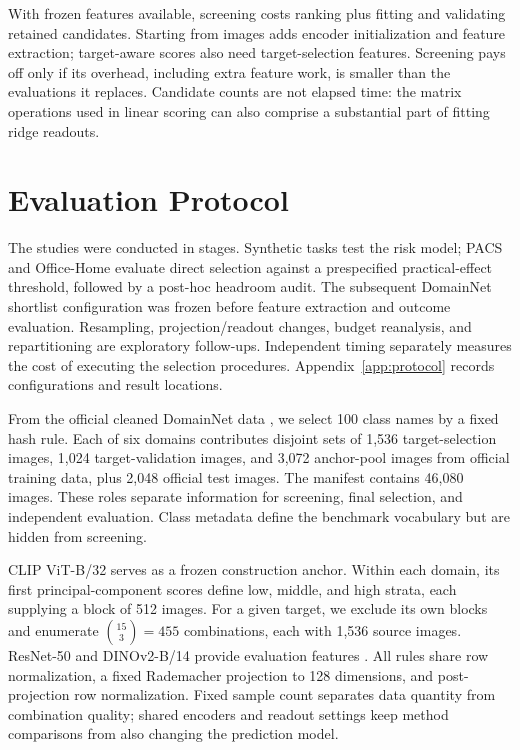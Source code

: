 With frozen features available, screening costs ranking plus fitting and validating retained candidates. Starting from images adds encoder initialization and feature extraction; target-aware scores also need target-selection features. Screening pays off only if its overhead, including extra feature work, is smaller than the evaluations it replaces. Candidate counts are not elapsed time: the matrix operations used in linear scoring can also comprise a substantial part of fitting ridge readouts.

\section{Evaluation Protocol}
\label{sec:protocol}
The studies were conducted in stages. Synthetic tasks test the risk model; PACS and Office-Home \citep{li2017,venkateswara2017} evaluate direct selection against a prespecified practical-effect threshold, followed by a post-hoc headroom audit. The subsequent DomainNet shortlist configuration was frozen before feature extraction and outcome evaluation. Resampling, projection/readout changes, budget reanalysis, and repartitioning are exploratory follow-ups. Independent timing separately measures the cost of executing the selection procedures. Appendix~\ref{app:protocol} records configurations and result locations.

From the official cleaned DomainNet data \citep{peng2019}, we select 100 class names by a fixed hash rule. Each of six domains contributes disjoint sets of 1,536 target-selection images, 1,024 target-validation images, and 3,072 anchor-pool images from official training data, plus 2,048 official test images. The manifest contains 46,080 images. These roles separate information for screening, final selection, and independent evaluation. Class metadata define the benchmark vocabulary but are hidden from screening.

CLIP ViT-B/32 \citep{radford2021} serves as a frozen construction anchor. Within each domain, its first principal-component scores define low, middle, and high strata, each supplying a block of 512 images. For a given target, we exclude its own blocks and enumerate $\binom{15}{3}=455$ combinations, each with 1,536 source images. ResNet-50 and DINOv2-B/14 provide evaluation features \citep{he2016,oquab2024}. All rules share row normalization, a fixed Rademacher projection to 128 dimensions, and post-projection row normalization. Fixed sample count separates data quantity from combination quality; shared encoders and readout settings keep method comparisons from also changing the prediction model.

